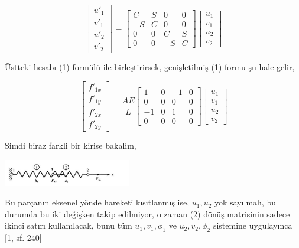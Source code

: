 \documentclass[12pt,fleqn]{article}\usepackage{../../common}
\begin{document}
$$
\left[\begin{array}{c}
u'_1 \\ v'_1 \\ u'_2 \\ v'_2
\end{array}\right] =
\left[\begin{array}{cccc}
C & S & 0 & 0 \\
-S & C & 0 & 0 \\
0 & 0 & C & S \\
0 & 0 & -S & C 
\end{array}\right]
\left[\begin{array}{c}
u_1 \\ v_1 \\ u_2 \\ v_2
\end{array}\right]
$$

Üstteki hesabı (1) formülü ile birleştirirsek, genişletilmiş (1) formu şu hale
gelir,

$$
\left[\begin{array}{c}
f'_{1x} \\ f'_{1y} \\ f'_{2x} \\ f'_{2y} 
\end{array}\right] =
\frac{AE}{L}
\left[\begin{array}{cccc}
1 & 0 & -1 & 0 \\
0 & 0 & 0 & 0 \\
-1 & 0 & 1 & 0 \\
0 & 0 & 0 & 0
\end{array}\right]
\left[\begin{array}{c}
u_1 \\ v_1 \\ u_2 \\ v_2
\end{array}\right]
$$

Simdi biraz farkli bir kirise bakalim, 

\includegraphics[width=15em]{phy_020_strs_06_02.jpg}

Bu parçanın eksenel yönde hareketi kısıtlanmış ise, $u_1,u_2$ yok sayılmalı,
bu durumda bu iki değişken takip edilmiyor, o zaman (2) dönüş matrisinin
sadece ikinci satırı kullanılacak, bunu tüm $u_1,v_1,\phi_1$ ve $u_2,v_2,\phi_2$
sistemine uygulayınca [1, sf. 240]
\end{document}

